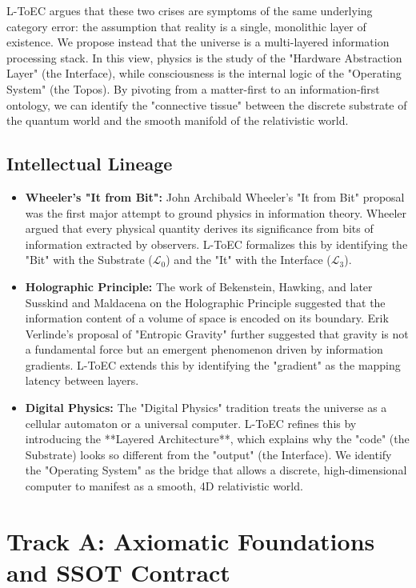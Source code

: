 \documentclass[11pt,titlepage]{article}
\newcommand{\substrate}{\mathcal{L}_0}
\newcommand{\interface}{\mathcal{L}_3}
\begin{document}
L-ToEC argues that these two crises are symptoms of the same underlying category error: the assumption that reality is a single, monolithic layer of existence. We propose instead that the universe is a multi-layered information processing stack. In this view, physics is the study of the "Hardware Abstraction Layer" (the Interface), while consciousness is the internal logic of the "Operating System" (the Topos). By pivoting from a matter-first to an information-first ontology, we can identify the "connective tissue" between the discrete substrate of the quantum world and the smooth manifold of the relativistic world.

\subsection{Intellectual Lineage}
\begin{itemize}
    
\item \textbf{Wheeler's "It from Bit":} John Archibald Wheeler's "It from Bit" proposal was the first major attempt to ground physics in information theory. Wheeler argued that every physical quantity derives its significance from bits of information extracted by observers. L-ToEC formalizes this by identifying the "Bit" with the Substrate ($\substrate$) and the "It" with the Interface ($\interface$).
    
\item \textbf{Holographic Principle:} The work of Bekenstein, Hawking, and later Susskind and Maldacena on the Holographic Principle suggested that the information content of a volume of space is encoded on its boundary. Erik Verlinde's proposal of "Entropic Gravity" further suggested that gravity is not a fundamental force but an emergent phenomenon driven by information gradients. L-ToEC extends this by identifying the "gradient" as the mapping latency between layers.
    
\item \textbf{Digital Physics:} The "Digital Physics" tradition treats the universe as a cellular automaton or a universal computer. L-ToEC refines this by introducing the **Layered Architecture**, which explains why the "code" (the Substrate) looks so different from the "output" (the Interface). We identify the "Operating System" as the bridge that allows a discrete, high-dimensional computer to manifest as a smooth, 4D relativistic world.
\end{itemize}

\section{Track A: Axiomatic Foundations and SSOT Contract}
\label{sec:axioms}
\end{document}
